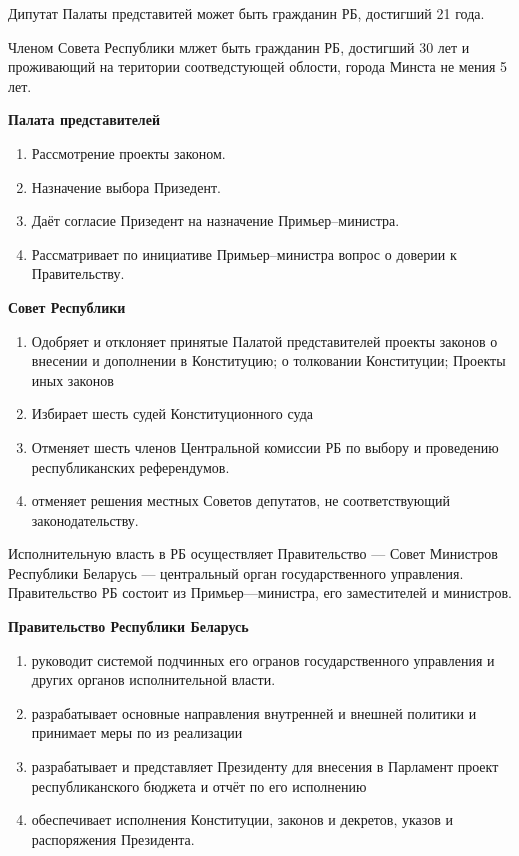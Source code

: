 \documentclass[14pt]{extarticle}
\begin{document}
	Дипутат Палаты представитей может быть гражданин РБ, достигший 21 года.
	
	Членом Совета Республики млжет быть гражданин РБ, достигший 30 лет и проживающий на територии соотведстующей облости, города Минста не мения 5 лет.
	
	\textbf{Палата представителей}
	\begin{enumerate}
		\item Рассмотрение проекты законом.
		\item Назначение выбора Призедент.
		\item Даёт согласие Призедент на назначение Примьер--министра.
		\item Рассматривает по инициативе Примьер--министра вопрос о доверии к Правительству.
	\end{enumerate}

	\textbf{Совет Республики}
	\begin{enumerate}
		\item Одобряет и отклоняет принятые Палатой представителей проекты законов о внесении и дополнении в Конституцию; о толковании Конституции; Проекты иных законов
		\item Избирает шесть судей Конституционного суда
		\item Отменяет шесть членов Центральной комиссии РБ по выбору и проведению республиканских референдумов.
		\item отменяет решения местных Советов депутатов, не соответствующий законодательству.
	\end{enumerate}

	Исполнительную власть в РБ осуществляет Правительство --- Совет Министров Республики Беларусь --- центральный орган государственного управления. 
	Правительство РБ состоит из Примьер---министра, его заместителей и министров.
	
	\textbf{Правительство Республики Беларусь}
	\begin{enumerate}
		\item руководит системой подчинных его огранов государственного управления и других органов исполнительной власти.
		\item разрабатывает основные направления внутренней и внешней политики и принимает меры по из реализации
		\item разрабатывает и представляет Президенту для внесения в Парламент проект республиканского бюджета и отчёт по его исполнению
		\item обеспечивает исполнения Конституции, законов и декретов, указов и распоряжения Президента.
	\end{enumerate}
	
\end{document}
